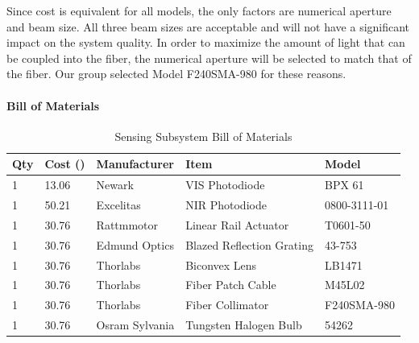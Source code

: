 Since cost is equivalent for all models, the only factors are numerical aperture and beam size. All three beam sizes are acceptable and will not have a significant impact on the system quality. In order to maximize the amount of light that can be coupled into the fiber, the numerical aperture will be selected to match that of the fiber. Our group selected Model F240SMA-980 for these reasons.

\paragraph{Bill of Materials}

\begin{table}[H]
	\centering
	\label{table:SensingBOM}
	\caption{Sensing Subsystem Bill of Materials}
	\bigskip
	\begin{tabular}{|p{2cm}|p{2.5cm}|p{2cm}|p{2.75cm}|p{1.75cm}|}
	\hline
	Qty & Cost (\textdollar) & Manufacturer & Item & Model\\
	\hline
	1 & 13.06 & Newark & VIS Photodiode & BPX 61\\
	\hline
	1 & 50.21 & Excelitas & NIR Photodiode & 0800-3111-01\\
	\hline
	1 & 30.76 & Rattmmotor & Linear Rail Actuator & T0601-50\\
	\hline
	1 & 30.76 & Edmund Optics & Blazed Reflection Grating & 43-753\\
	\hline
	1 & 30.76 & Thorlabs & Biconvex Lens & LB1471\\
	\hline
	1 & 30.76 & Thorlabs & Fiber Patch Cable & M45L02\\
	\hline
	1 & 30.76 & Thorlabs & Fiber Collimator & F240SMA-980\\
	\hline
	1 & 30.76 & Osram Sylvania & Tungsten Halogen Bulb & 54262\\
	\hline
	\end{tabular}
\end{table}